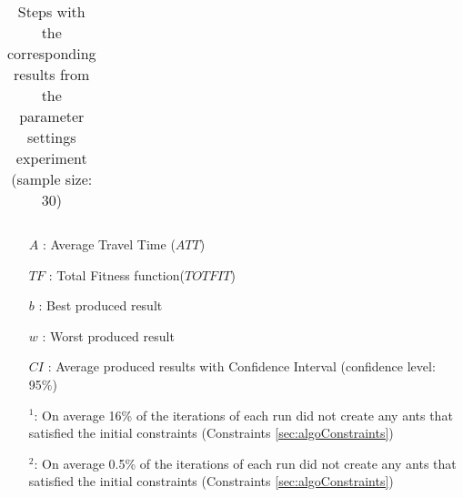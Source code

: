 \begin{sidewaystable}
\begin{tabular}{|l|l|l|l|l||c|c|c|c|c|c|c|}
    
 
  
    \hline
    \end{tabular}
    \caption {Steps with the corresponding results from the parameter settings experiment (sample size: 30)}
    \tiny
    \begin{itemize}[noitemsep]
    \item[$A$ :] Average Travel Time ($ATT$)
    \item[$TF$ :] Total Fitness function($TOTFIT$)
    \item[$b$ :] Best produced result
    \item[$w$ :] Worst produced result
    \item[$CI$ :] Average produced results with Confidence Interval (confidence level: 95\%)
    \item[$^1$:] On average 16\% of the iterations of each run did not create any ants that satisfied the initial constraints (Constraints \vref{sec:algoConstraints})
    \item[$^2$:] On average 0.5\% of the iterations of each run did not create any ants that satisfied the initial constraints (Constraints \vref{sec:algoConstraints})
    \end{itemize}
    \label{table:pm1}
\end{sidewaystable}

